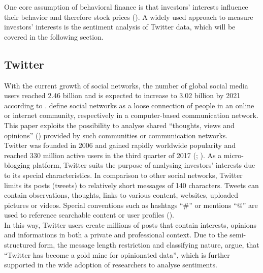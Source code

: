 \documentclass[a4paper,american,12pt]{article}
\begin{document}
\begin{spacing}{1.2}
One core assumption of behavioral finance is that investors’ interests influence their behavior and therefore stock prices (\cite[p.~3]{mao2015quantifying}). A widely used approach to measure investors’ interests is the sentiment analysis of Twitter data, which will be covered in the following section.\\

\subsection{Twitter}
With the current growth of social networks, the number of global social media users reached 2.46 billion and is expected to increase to 3.02 billion by 2021 according to \textcite{Statista2018a}. \textcite[p.~12]{Gabriel2017socialmedia} define social networks as a loose connection of people in an online or internet community, respectively in a computer-based communication network. This paper exploits the possibility to analyse shared “thoughts, views and opinions” (\cite[p.~6]{stenqvist2017predicting}) provided by such communities or communication networks.\\

Twitter was founded in 2006 and gained rapidly worldwide popularity and reached 330 million active users in the third quarter of 2017 (\cite[]{twitterinc2018}; \cite[]{Statista2018b}). As a micro-blogging platform, Twitter suits the purpose of analysing investors’ interests due to its special characteristics. In comparison to other social networks, Twitter limits its posts (tweets) to relatively short messages of 140 characters. Tweets can contain observations, thoughts, links to various content, websites, uploaded pictures or videos. Special conventions such as hashtags “\#” or mentions “@” are used to reference searchable content or user profiles (\cite{Schmidt2018socialmedia}).\\

In this way, Twitter users create millions of posts that contain interests, opinions and informations in both a private and professional context.  Due to the semi-structured form, the message length restriction and classifying nature, \textcite[p.~6]{stenqvist2017predicting} argue, that “Twitter has become a gold mine for opinionated data”, which is further supported in the wide adoption of researchers to analyse sentiments.\\


\end{spacing}
\end{document}
